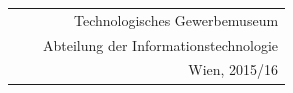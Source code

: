 \begin{titlepage}
	{\begin{table}[!h] \bfseries\normalsize
		\begin{tabularx}{\textwidth}{lXr @{\hspace{0mm}}}
			&& Technologisches Gewerbemuseum\\
			&& Abteilung der Informationstechnologie\\
			&& Wien, 2015/16\\[10mm]
		\end{tabularx}
	\end{table}}

\end{titlepage}
